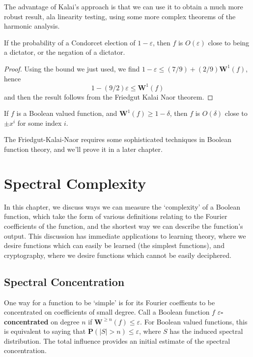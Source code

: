 The advantage of Kalai's approach is that we can use it to obtain a much more robust result, ala linearity testing, using some more complex theorems of the harmonic analysis.

\begin{theorem}
    If the probability of a Condorcet election of $1 - \varepsilon$, then $f$ is $O(\varepsilon)$ close to being a dictator, or the negation of a dictator.
\end{theorem}
\begin{proof}
    Using the bound we just used, we find $1 - \varepsilon \leq (7/9) + (2/9) \mathbf{W}^1(f)$, hence
    \[ 1 - (9/2) \varepsilon \leq \mathbf{W}^1(f) \]
    and then the result follows from the Friedgut Kalai Naor theorem.
\end{proof}

\begin{theorem}
    If $f$ is a Boolean valued function, and $\mathbf{W}^1(f) \geq 1 - \delta$, then $f$ is $O(\delta)$ close to $\pm x^i$ for some index $i$.
\end{theorem}

The Friedgut-Kalai-Naor requires some sophisticated techniques in Boolean function theory, and we'll prove it in a later chapter.








\chapter{Spectral Complexity}

In this chapter, we discuss ways we can measure the `complexity' of a Boolean function, which take the form of various definitions relating to the Fourier coefficients of the function, and the shortest way we can describe the function's output. This discussion has immediate applications to learning theory, where we desire functions which can easily be learned (the simplest functions), and cryptography, where we desire functions which cannot be easily deciphered.

\section{Spectral Concentration}

One way for a function to be `simple' is for its Fourier coeffients to be concentrated on coefficients of small degree. Call a Boolean function $f$ {\bf $\varepsilon$-concentrated} on degree $n$ if $\mathbf{W}^{\geq n}(f) \leq \varepsilon$. For Boolean valued functions, this is equivalent to saying that $\mathbf{P}(|S| > n) \leq \varepsilon$, where $S$ has the induced spectral distribution. The total influence provides an initial estimate of the spectral concentration.

